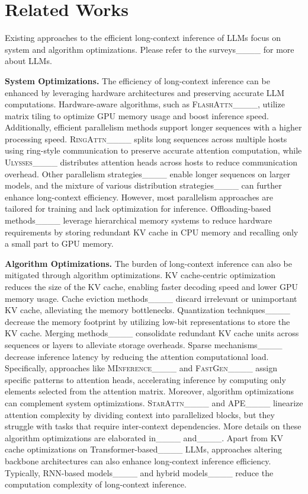 \section{Related Works}
\vspace{-2pt}
\label{sec:related}

Existing approaches to the efficient long-context inference of LLMs focus on system and algorithm optimizations. Please refer to the surveys____ for more about LLMs.

\textbf{System Optimizations.}  
The efficiency of long-context inference can be enhanced by leveraging hardware architectures and preserving accurate LLM computations. 
Hardware-aware algorithms, such as \textsc{FlashAttn}____, utilize matrix tiling to optimize GPU memory usage and boost inference speed. 
Additionally, efficient parallelism methods support longer sequences with a higher processing speed. 
\textsc{RingAttn}____ splits long sequences across multiple hosts using ring-style communication to preserve accurate attention computation, while \textsc{Ulysses}____ distributes attention heads across hosts to reduce communication overhead. 
Other parallelism strategies____ enable longer sequences on larger models, and the mixture of various distribution strategies____ can further enhance long-context efficiency. 
However, most parallelism approaches are tailored for training and lack optimization for inference. 
Offloading-based methods____ leverage hierarchical memory systems to reduce hardware requirements by storing redundant KV cache in CPU memory and recalling only a small part to GPU memory.


\textbf{Algorithm Optimizations.}  
The burden of long-context inference can also be mitigated through algorithm optimizations. 
KV cache-centric optimization reduces the size of the KV cache, enabling faster decoding speed and lower GPU memory usage. 
Cache eviction methods____ discard irrelevant or unimportant KV cache, alleviating the memory bottlenecks. 
Quantization techniques____ decrease the memory footprint by utilizing low-bit representations to store the KV cache. 
Merging methods____ consolidate redundant KV cache units across sequences or layers to alleviate storage overheads. 
Sparse mechanisms____ decrease inference latency by reducing the attention computational load. Specifically, approaches like \textsc{MInference}____ and \textsc{FastGen}____ assign specific patterns to attention heads, accelerating inference by computing only elements selected from the attention matrix. 
Moreover, algorithm optimizations can complement system optimizations.
\textsc{StarAttn}____ and \textsc{APE}____ linearize attention complexity by dividing context into parallelized blocks, but they struggle with tasks that require inter-context dependencies.
More details on these algorithm optimizations are elaborated in____ and____.
Apart from KV cache optimizations on Transformer-based____ LLMs, approaches altering backbone architectures can also enhance long-context inference efficiency.
Typically, RNN-based models____ and hybrid models____ reduce the computation complexity of long-context inference.